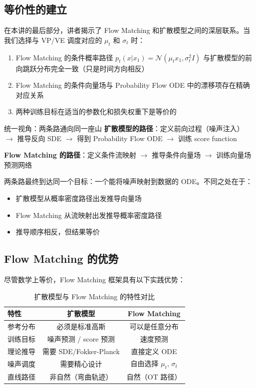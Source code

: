 \documentclass[a4paper]{article}
\begin{document}
\subsection{等价性的建立}

在本讲的最后部分，讲者揭示了 Flow Matching 和扩散模型之间的深层联系。当我们选择与 VP/VE 调度对应的 $\mu_t$ 和 $\sigma_t$ 时：

\begin{enumerate}
    \item Flow Matching 的条件概率路径 $p_t(x | x_1) = \mathcal{N}(\mu_t x_1, \sigma_t^2 I)$ 与扩散模型的前向跳跃分布完全一致（只是时间方向相反）
    \item Flow Matching 的条件向量场与 Probability Flow ODE 中的漂移项存在精确对应关系
    \item 两种训练目标在适当的参数化和损失权重下是等价的
\end{enumerate}

\begin{importantbox}{统一视角：两条路通向同一座山}
\textbf{扩散模型的路径}：定义前向过程（噪声注入） $\to$ 推导反向 SDE $\to$ 得到 Probability Flow ODE $\to$ 训练 score function

\textbf{Flow Matching 的路径}：定义条件流映射 $\to$ 推导条件向量场 $\to$ 训练向量场预测网络

两条路最终到达同一个目标：一个能将噪声映射到数据的 ODE。不同之处在于：
\begin{itemize}
    \item 扩散模型从概率密度路径出发推导向量场
    \item Flow Matching 从流映射出发推导概率密度路径
    \item 推导顺序相反，但结果等价
\end{itemize}
\end{importantbox}

\subsection{Flow Matching 的优势}

尽管数学上等价，Flow Matching 框架具有以下实践优势：

\begin{table}[H]
\centering
\begin{tabular}{lcc}
\toprule
\textbf{特性} & \textbf{扩散模型} & \textbf{Flow Matching} \\
\midrule
参考分布 & 必须是标准高斯 & 可以是任意分布 \\
训练目标 & 噪声预测 / score 预测 & 速度预测 \\
理论推导 & 需要 SDE/Fokker-Planck & 直接定义 ODE \\
噪声调度 & 需要精心设计 & 自由选择 $\mu_t$, $\sigma_t$ \\
直线路径 & 非自然（弯曲轨迹） & 自然（OT 路径） \\
\bottomrule
\end{tabular}
\caption{扩散模型与 Flow Matching 的特性对比}
\end{table}
\end{document}
